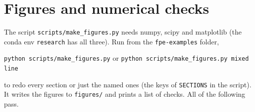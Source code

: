\documentclass[11pt]{article}
\numberwithin{equation}{section}
\begin{document}
\appendix
{}
\section{Figures and numerical checks}
\label{app:checks}

The script \texttt{scripts/make\_figures.py} needs numpy, scipy and matplotlib (the conda env
\texttt{research} has all three). Run from the \texttt{fpe-examples} folder,
\begin{center}
  \texttt{python scripts/make\_figures.py} \quad or \quad \texttt{python scripts/make\_figures.py mixed line}
\end{center}
to redo every section or just the named ones (the keys of \texttt{SECTIONS} in the script). It writes the
figures to \texttt{figures/} and prints a list of checks. All of the following pass.
\end{document}
